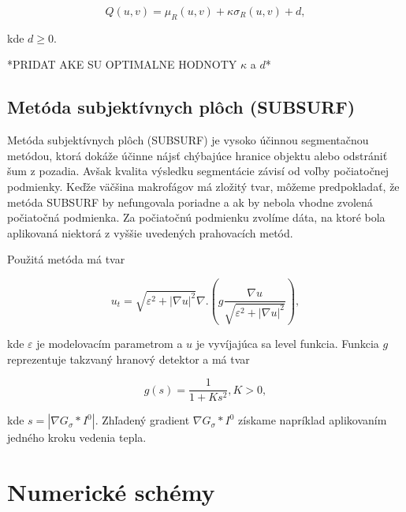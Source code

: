 \documentclass[a4paper,11pt,twoside]{article}%
\def\epsilon{\varepsilon}
\begin{document}
\begin{equation}
Q(u,v) = \mu_R(u,v) + \kappa\sigma_R(u,v) + d,
\end{equation}

kde $d \geq 0$.

*PRIDAT AKE SU OPTIMALNE HODNOTY $\kappa$ a $d$*



\subsection{Metóda subjektívnych plôch (SUBSURF)} 

Metóda subjektívnych plôch (SUBSURF) je vysoko účinnou segmentačnou metódou, ktorá dokáže účinne nájsť chýbajúce hranice objektu alebo odstrániť šum z pozadia. Avšak kvalita výsledku segmentácie závisí od voľby počiatočnej podmienky. Keďže väčšina makrofágov má zložitý tvar, môžeme predpokladať, že metóda SUBSURF by nefungovala poriadne a ak by nebola vhodne zvolená počiatočná podmienka. Za počiatočnú podmienku zvolíme dáta, na ktoré bola aplikovaná niektorá z vyššie uvedených prahovacích metód.

Použitá metóda má tvar

\begin{equation} \label{eq:subsurf}
u_t = \sqrt{\epsilon^2 + |\nabla u|^2}\nabla.(g \frac{\nabla u}{\sqrt{\epsilon^2 + |\nabla u|^2}}),
\end{equation}

kde $\epsilon$ je modelovacím parametrom a $u$ je vyvíjajúca sa level funkcia. Funkcia $g$ reprezentuje takzvaný hranový detektor a má tvar

\begin{equation}
g(s) = \frac{1}{1+Ks^2}, K > 0,
\end{equation}

kde $s = |\nabla G_\sigma*I^0|$. Zhľadený gradient $\nabla G_\sigma*I^0$ získame napríklad aplikovaním jedného kroku vedenia tepla.




\newpage
\section{Numerické schémy}
\end{document}
